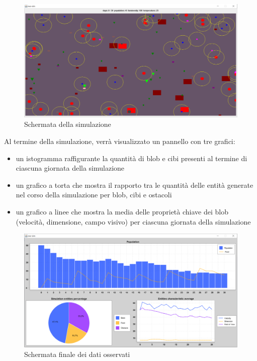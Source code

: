 \begin{figure}[h!]
\centering
\includegraphics[width=\textwidth, scale=0.44]{img/SimulationInterface.png}
\caption{Schermata della simulazione}
\label{fig:SimulationInterface}
\end{figure}

Al termine della simulazione, verrà visualizzato un pannello con tre grafici:
\begin{itemize}
\item un istogramma raffigurante la quantità di blob e cibi presenti al termine di ciascuna giornata della simulazione
\item un grafico a torta che mostra il rapporto tra le quantità delle entità generate nel corso della simulazione per blob, cibi e ostacoli
\item un grafico a linee che mostra la media delle proprietà chiave dei blob (velocità, dimensione, campo visivo) per ciascuna giornata della simulazione
\end{itemize}

\begin{figure}[h!]
\centering
\includegraphics[width=\textwidth, scale=0.44]{img/ResultsInterface.png}
\caption{Schermata finale dei dati osservati}
\label{fig:ResultsInterface}
\end{figure}

